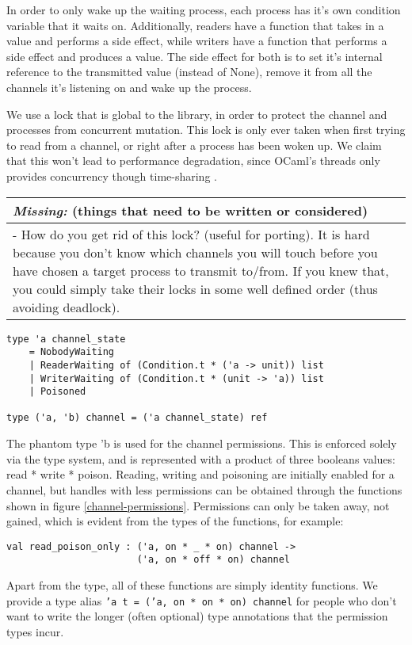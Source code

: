 \documentclass[11pt,oneside,a4paper]{article}
\newcommand{\missing}[1]{
\begin{tabular}{|p{11cm}|}
\hline
\emph{Missing:} {\scriptsize (things that need to be written or considered)} \\
\hline
#1
\hline
\end{tabular}
}
\begin{document}
In order to only wake up the waiting process, each process has it's own condition variable that
it waits on. Additionally, readers have a function that takes in a value and performs a side 
effect, while writers have a function that performs a side effect and produces a value. The side
effect for both is to set it's internal reference to the transmitted value (instead of None),
remove it from all the channels it's listening on and wake up the process.

We use a lock that is global to the library, in order to protect the channel and processes from
concurrent mutation. This lock is only ever taken when first trying to read from a channel, or
right after a process has been woken up. We claim that this won't lead to performance degradation,
since OCaml's threads only provides concurrency though time-sharing \cite{ocaml-threads}.

\missing{
- How do you get rid of this lock? (useful for porting). It is hard because you don't know which
channels you will touch before you have chosen a target process to transmit to/from. If you knew
that, you could simply take their locks in some well defined order (thus avoiding deadlock). \\
}

\begin{verbatim}
type 'a channel_state
    = NobodyWaiting 
    | ReaderWaiting of (Condition.t * ('a -> unit)) list
    | WriterWaiting of (Condition.t * (unit -> 'a)) list
    | Poisoned

type ('a, 'b) channel = ('a channel_state) ref
\end{verbatim}

The phantom type 'b is used for the channel permissions. This is enforced solely via the type
system, and is represented with a product of three booleans values: read * write * poison.
Reading, writing and poisoning are initially enabled for a channel, but handles with less 
permissions can be obtained through the functions shown in figure \ref{channel-permissions}. 
Permissions can only be taken away, not gained, which is evident from the types of the 
functions, for example: 

\begin{verbatim}
val read_poison_only : ('a, on * _ * on) channel -> 
                       ('a, on * off * on) channel
\end{verbatim}

Apart from the type, all of these functions are simply identity functions. We provide a
type alias \texttt{'a t = ('a, on * on * on) channel} for people who don't want to write the
longer (often optional) type annotations that the permission types incur.
\end{document}
